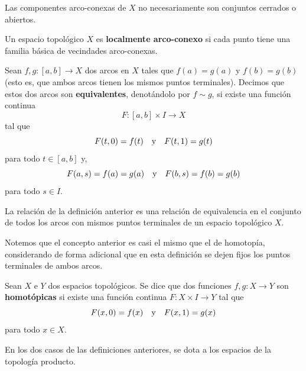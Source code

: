\documentclass[12pt]{report}
\theoremstyle{largebreak}
\newcommand\cf[3]{\ensuremath{#1:#2\rightarrow#3}}
\begin{document}
    Las componentes arco-conexas de $X$ no necesariamente son conjuntos cerrados o abiertos.

    \begin{mydef}
        Un espacio topológico $X$ es \textbf{localmente arco-conexo} si cada punto tiene una familia básica de vecindades arco-conexas.
    \end{mydef}

    \begin{mydef}
        Sean $\cf{f,g}{[a,b]}{X}$ dos arcos en $X$ tales que $f(a)=g(a)$ y $f(b)=g(b)$ (esto es, que ambos arcos tienen los mismos puntos terminales). Decimos que estos dos arcos son \textbf{equivalentes}, denotándolo por $f\sim g$, si existe una función continua
        \begin{equation*}
            \cf{F}{[a,b]\times I}{X}
        \end{equation*}
        tal que
        \begin{equation*}
            F(t,0)=f(t)\quad\textup{y}\quad F(t,1)=g(t)
        \end{equation*}
        para todo $t\in[a,b]$ y,
        \begin{equation*}
            F(a,s)=f(a)=g(a)\quad\textup{y}\quad F(b,s)=f(b)=g(b)
        \end{equation*}
        para todo $s\in I$.
    \end{mydef}

    \begin{propo}
        La relación de la definición anterior es una relación de equivalencia en el conjunto de todos los arcos con mismos puntos terminales de un espacio topológico $X$.
    \end{propo}

    Notemos que el concepto anterior es casi el mismo que el de homotopía, considerando de forma adicional que en esta definición se dejen fijos los puntos terminales de ambos arcos.

    \begin{mydef}
        Sean $X$ e $Y$ dos espacios topológicos. Se dice que dos funciones $\cf{f,g}{X}{Y}$ son \textbf{homotópicas} si existe una función continua $\cf{F}{X\times I}{Y}$ tal que
        \begin{equation*}
            F(x,0)=f(x)\quad\textup{y}\quad F(x,1)=g(x)
        \end{equation*}
        para todo $x\in X$.
    \end{mydef}

    \begin{obs}
        En los dos casos de las definiciones anteriores, se dota a los espacios de la topología producto.
    \end{obs}
\end{document}
